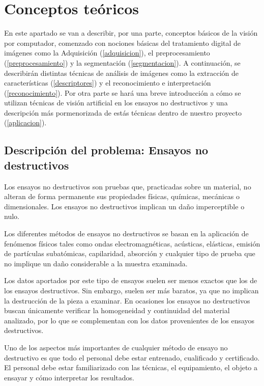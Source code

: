 \chapter{Conceptos teóricos}

En este apartado se van a describir, por una parte, conceptos básicos de la visión por computador, comenzado con nociones básicas del tratamiento digital de imágenes como la Adquisición (\ref{adquisicion}), el preprocesamiento (\ref{preprocesamiento}) y la segmentación (\ref{segmentacion}). A continuación, se describirán distintas técnicas de análisis de imágenes como la extracción de características (\ref{descriptores}) y el reconocimiento e interpretación (\ref{reconocimiento}). Por otra parte se hará una breve introducción a cómo se utilizan técnicas de visión artificial en los ensayos no destructivos y una descripción más pormenorizada de estás técnicas dentro de nuestro proyecto (\ref{aplicacion}).


\section{Descripción del problema: Ensayos no destructivos}
Los ensayos no destructivos \cite{wiki:EnsayoNoDestructivo} son pruebas que, practicadas sobre un material, no alteran de forma permanente sus propiedades físicas, químicas, mecánicas o dimensionales. Los ensayos no destructivos implican un daño imperceptible o nulo.

Los diferentes métodos de ensayos no destructivos se basan en la aplicación de fenómenos físicos tales como ondas electromagnéticas, acústicas, elásticas, emisión de partículas subatómicas, capilaridad, absorción y cualquier tipo de prueba que no implique un daño considerable a la muestra examinada.

Los datos aportados por este tipo de ensayos suelen ser menos exactos que los de los ensayos destructivos. Sin embargo, suelen ser más baratos, ya que no implican la destrucción de la pieza a examinar. En ocasiones los ensayos no destructivos buscan únicamente verificar la homogeneidad y continuidad del material analizado, por lo que se complementan con los datos provenientes de los ensayos destructivos.

Uno de los aspectos más importantes de cualquier método de ensayo no destructivo es que todo el personal debe estar entrenado, cualificado y certificado. El personal debe estar familiarizado con las técnicas, el equipamiento, el objeto a ensayar y cómo interpretar los resultados.

